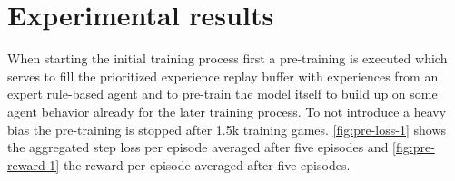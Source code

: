 \section{Experimental results} \label{experimental_results}


When starting the initial training process first a pre-training is executed which serves to fill the prioritized experience replay buffer with experiences from an expert rule-based agent and to pre-train the model itself to build up on some agent behavior already for the later training process. To not introduce a heavy bias the pre-training is stopped after 1.5k training games. \autoref{fig:pre-loss-1} shows the aggregated step loss per episode averaged after five episodes and \autoref{fig:pre-reward-1} the reward per episode averaged after five episodes.

\newpage 

